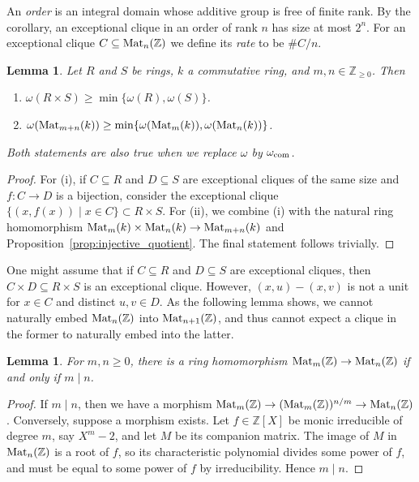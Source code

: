 \documentclass{amsart}
\theoremstyle{plain}
\newtheorem{lemma}[theorem]{Lemma}
\theoremstyle{definition}
\newtheorem{remark}[theorem]{Remark}
\newcommand{\Z}{\ensuremath{\mathbb{Z}}}
\newcommand{\clq}{C}
\newcommand{\clqb}{D}
\newcommand{\crg}{k}
\newcommand{\nrg}{R}
\begin{document}
An \emph{order} is an integral domain whose additive group is free of finite rank. By the corollary, an exceptional clique in an order of rank \(n\) has size at most \(2^n\).
For an exceptional clique \(\clq\subseteq\textup{Mat}_n(\Z)\) we define its \emph{rate} to be \(\#\clq/n\).

\begin{lemma}\label{lem:trivial_induction}
	Let \(\nrg\) and \(S\) be rings, \(\crg\) a commutative ring, and \(m,n\in\Z_{\geq0}\). Then
	\begin{enumerate}[nosep]
		\item \(\omega(\nrg\times S)\geq \min\{\omega(\nrg),\omega(S)\}\).
		
		\item \(\omega(\textup{Mat}_{m+n}(\crg))\geq \min\{\omega(\textup{Mat}_m(\crg)),\omega(\textup{Mat}_n(\crg))\}\).
	\end{enumerate}
	Both statements are also true when we replace \(\omega\) by \(\omega_{\textup{com}}\).
\end{lemma}
\begin{proof}
	For (i), if \(\clq\subseteq \nrg\) and \(\clqb\subseteq S\) are exceptional cliques of the same size and $f\colon \clq\to\clqb$ is a bijection, consider the exceptional clique $\{(x,f(x)) \mid x\in\clq\}\subset \nrg\times S$. For (ii), we combine (i) with the natural ring homomorphism \(\textup{Mat}_m(\crg)\times\textup{Mat}_n(\crg)\to\textup{Mat}_{m+n}(\crg)\) and Proposition~\ref{prop:injective_quotient}. The final statement follows trivially.
\end{proof}

One might assume that if \(\clq\subseteq \nrg\) and \(\clqb\subseteq S\) are exceptional cliques, then \(\clq\times \clqb\subseteq \nrg\times S\) is an exceptional clique. However, \((x,u)-(x,v)\) is not a unit for \(x\in \clq\) and distinct \(u,v\in \clqb\). As the following lemma shows, we cannot naturally embed \(\textup{Mat}_n(\Z)\) into \(\textup{Mat}_{n+1}(\Z)\), and thus cannot expect a clique in the former to naturally embed into the latter.

\begin{lemma}\label{lem:matrix_embed}
	For \(m,n\geq 0\), there is a ring homomorphism \(\textup{Mat}_m(\Z)\to\textup{Mat}_n(\Z)\) if and only if \(m\mid n\).
\end{lemma}
\begin{proof}
	If \(m\mid n\), then we have a morphism \(\textup{Mat}_m(\Z)\to(\textup{Mat}_m(\Z))^{n/m}\to\textup{Mat}_n(\Z)\). Conversely, suppose a morphism exists.
	Let \(f\in\Z[X]\) be monic irreducible of degree \(m\), say \(X^m-2\), and let \(M\) be its companion matrix. The image of \(M\) in \(\textup{Mat}_n(\Z)\) is a root of \(f\), so its characteristic polynomial divides some power of \(f\), and must be equal to some power of \(f\) by irreducibility.
	Hence \(m\mid n\).
\end{proof}
\end{document}
